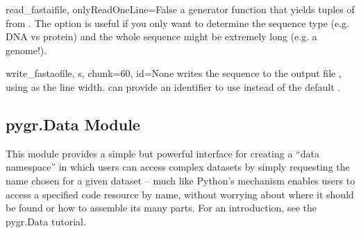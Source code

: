 \documentclass{howto}
\begin{document}
\begin{funcdesc}{read_fasta}{ifile, onlyReadOneLine=False}
  a generator function
  that yields tuples of  from .  
  The  option is useful if you only want to 
  determine the sequence type (e.g. DNA vs protein) and the
  whole sequence might be extremely long (e.g. a genome!).
\end{funcdesc}

\begin{funcdesc}{write_fasta}{ofile, s, chunk=60, id=None}
  writes the sequence 
  to the output file , using  as the line width.
   can provide an identifier to use instead of the default 
  .
\end{funcdesc}

\subsection{pygr.Data Module}
\label{pygrData-module}
This module provides a simple but powerful interface for creating
a ``data namespace'' in which users can access complex datasets
by simply requesting the name chosen for a given dataset -- much
like Python's  mechanism enables users to access
a specified code resource by name, without worrying about where it
should be found or how to assemble its many parts.  For an introduction,
see the pygr.Data tutorial.
\end{document}
